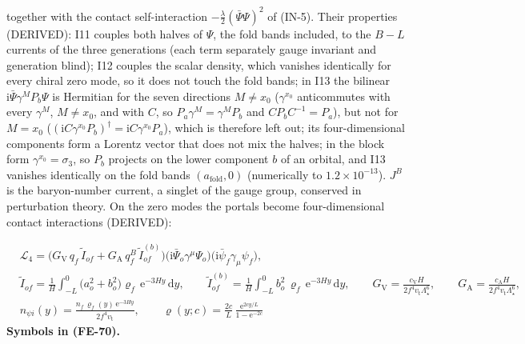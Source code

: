 \documentclass[
  10pt,
]{article}
\begin{document}
together with the contact self-interaction
\(-\frac{\lambda}{2}(\bar\Psi\Psi)^2\) of (IN-5). Their properties
(DERIVED): I11 couples both halves of \(\Psi\), the fold bands included,
to the \(B - L\) currents of the three generations (each term separately
gauge invariant and generation blind); I12 couples the scalar density,
which vanishes identically for every chiral zero mode, so it does not
touch the fold bands; in I13 the bilinear
\(\mathrm{i}\bar\Psi\gamma^MP_b\Psi\) is Hermitian for the seven
directions \(M \ne x_0\) (\(\gamma^{x_0}\) anticommutes with every
\(\gamma^M\), \(M \ne x_0\), and with \(C\), so
\(P_a\gamma^M = \gamma^MP_b\) and \(CP_bC^{-1} = P_a\)), but not for
\(M = x_0\)
(\((\mathrm{i}C\gamma^{x_0}P_b)^\dagger = \mathrm{i}C\gamma^{x_0}P_a\)),
which is therefore left out; its four-dimensional components form a
Lorentz vector that does not mix the halves; in the block form
\(\gamma^{x_0} = \sigma_3\), so \(P_b\) projects on the lower component
\(b\) of an orbital, and I13 vanishes identically on the fold bands
\((a_{\mathrm{fold}}, 0)\) (numerically to \(1.2\times10^{-13}\)).
\(J^B\) is the baryon-number current, a singlet of the gauge group,
conserved in perturbation theory. On the zero modes the portals become
four-dimensional contact interactions (DERIVED):

\[
\begin{aligned}
&\mathcal{L}_4 = \big(G_{\mathrm{V}}\,q_f\,\tilde I_{of} + G_{\mathrm{A}}\,q^{B}_f\,\tilde I^{(b)}_{of}\big)
 \big(\mathrm{i}\bar\Psi_o\gamma^\mu\Psi_o\big)\big(\mathrm{i}\bar\psi_f\gamma_\mu\psi_f\big),\\
&\tilde I_{of} = \frac{1}{H}\int_{-L}^{0}\big(a_o^2 +
 b_o^2\big)\varrho_f\,\mathrm{e}^{-3Hy}\,\mathrm{d}y,\qquad
 \tilde I^{(b)}_{of} = \frac{1}{H}\int_{-L}^{0}b_o^2\,\varrho_f\,\mathrm{e}^{-3Hy}\,\mathrm{d}y,\qquad
 G_{\mathrm{V}} = \frac{c_{\mathrm{V}}H}{2f^4v_{\mathrm{t}}\Lambda_\star^6},\qquad
 G_{\mathrm{A}} = \frac{c_{\mathrm{A}}H}{2f^4v_{\mathrm{t}}\Lambda_\star^6},\\
&n_{\psi i}(y) = \frac{n_f\,\varrho_f(y)\,\mathrm{e}^{-3Hy}}{2f^4v_{\mathrm{t}}},\qquad
 \varrho(y; c) = \frac{2c}{L}\,\frac{\mathrm{e}^{2cy/L}}{1 - \mathrm{e}^{-2c}}
\end{aligned} \tag{FE-70}
\] \textbf{Symbols in (FE-70).}
\end{document}
